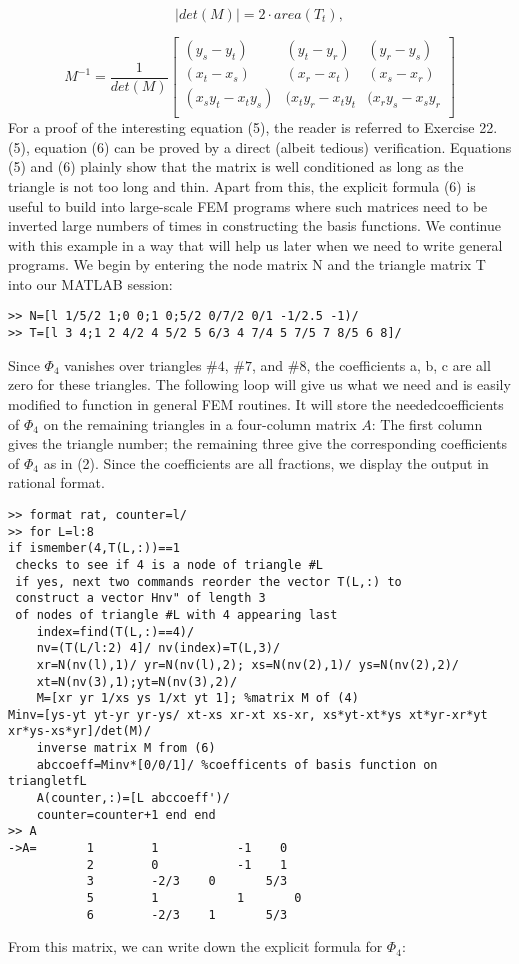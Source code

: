 \documentclass[../main.tex]{subfiles}
\begin{document}
\begin{equation}
	|det(M)|=2 \cdot area(T_t),
\end{equation}

\begin{equation}
	M^{-1}=\dfrac{1}{det(M)}
	\begin{bmatrix} 
		  (y_s-y_t) & (y_t-y_r) & (y_r-y_s)\\
		  (x_t-x_s) & (x_r-x_t) & (x_s-x_r)\\
		  (x_s y_t -x_t y_s) & (x_t y_r -x_t y_t & (x_r y_s -x_s y_r\\	 
	\end{bmatrix}
\end{equation}
For a proof of the interesting equation (5), the reader is referred to Exercise 22. 
 (5), equation (6) can be proved by a direct (albeit tedious) verification. Equations (5) and (6) plainly show that the matrix is well conditioned as long as the triangle is not too long and thin. Apart from this, the explicit formula (6) is useful to build into large-scale FEM programs where such matrices need to be inverted large numbers of times in constructing the basis functions. We continue with this example in a way that will help us later when we need to write general programs. We begin by entering the node matrix N and the triangle matrix T into our MATLAB session: 

\begin{lstlisting}[numbers=none,frame=none]
>> N=[l 1/5/2 1;0 0;1 0;5/2 0/7/2 0/1 -1/2.5 -1)/ 
>> T=[l 3 4;1 2 4/2 4 5/2 5 6/3 4 7/4 5 7/5 7 8/5 6 8]/
\end{lstlisting}

Since $\Phi_4$ vanishes over triangles $\#4$, $\#7$, and $\#8$, the coefficients a, b, c are all zero for these triangles. The following loop will give us what we need and is easily modified to function in general FEM routines. It will store the neededcoefficients of $\Phi_4$ on the remaining triangles in a four-column matrix $A$: The first column gives the triangle number; the remaining three give the corresponding coefficients of $\Phi_4$ as in (2). Since the coefficients are all fractions, we display the output in rational format. 

\begin{lstlisting}[numbers=none,frame=none]
>> format rat, counter=l/ 
>> for L=l:8 
if ismember(4,T(L,:))==1 
 checks to see if 4 is a node of triangle #L 
 if yes, next two commands reorder the vector T(L,:) to 
 construct a vector Hnv" of length 3 
 of nodes of triangle #L with 4 appearing last 
	index=find(T(L,:)==4)/ 
	nv=(T(L/l:2) 4]/ nv(index)=T(L,3)/ 
	xr=N(nv(l),1)/ yr=N(nv(l),2); xs=N(nv(2),1)/ ys=N(nv(2),2)/ 
	xt=N(nv(3),1);yt=N(nv(3),2)/ 
	M=[xr yr 1/xs ys 1/xt yt 1]; %matrix M of (4) 
Minv=[ys-yt yt-yr yr-ys/ xt-xs xr-xt xs-xr, xs*yt-xt*ys xt*yr-xr*yt 
xr*ys-xs*yr]/det(M)/ 
	inverse matrix M from (6) 
	abccoeff=Minv*[0/0/1]/ %coefficents of basis function on triangletfL 
	A(counter,:)=[L abccoeff')/ 
	counter=counter+1 end end 
>> A
->A=       1		1			-1	  0
           2		0			-1	  1
           3		-2/3	0	    5/3
           5		1			1	    0
           6		-2/3	1	    5/3
\end{lstlisting}
From this matrix, we can write down the explicit formula for $\Phi_4$: 
\end{document}
